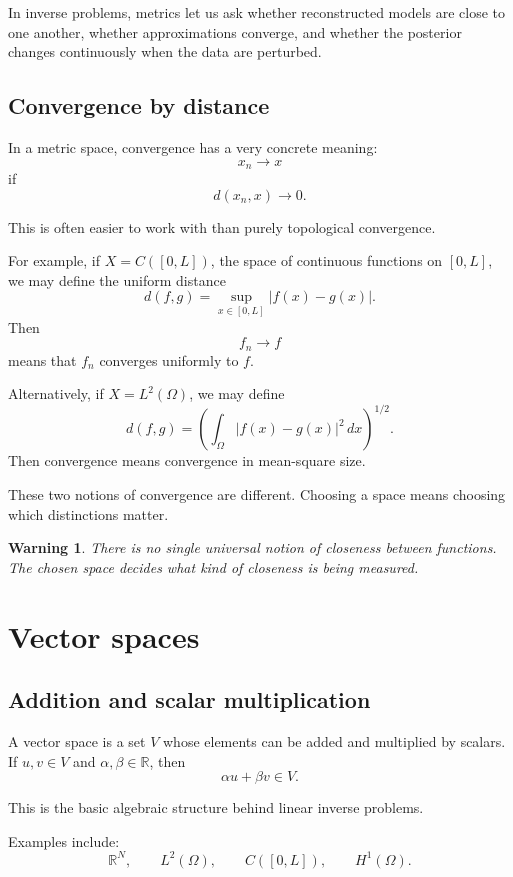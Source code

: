 \documentclass[11pt,a4paper]{book}
\newtheorem{warning}[definition]{Warning}
\newcommand{\R}{\mathbb{R}}
\begin{document}
In inverse problems, metrics let us ask whether reconstructed models are close
to one another, whether approximations converge, and whether the posterior
changes continuously when the data are perturbed.

\subsection{Convergence by distance}

In a metric space, convergence has a very concrete meaning:
\[
    x_n \to x
\]
if
\[
    d(x_n,x)\to 0.
\]

This is often easier to work with than purely topological convergence.

For example, if $X=C([0,L])$, the space of continuous functions on $[0,L]$, we
may define the uniform distance
\[
    d(f,g)
    =
    \sup_{x\in[0,L]} |f(x)-g(x)|.
\]
Then
\[
    f_n \to f
\]
means that $f_n$ converges uniformly to $f$.

Alternatively, if $X=L^2(\Omega)$, we may define
\[
    d(f,g)
    =
    \left(
        \int_\Omega |f(x)-g(x)|^2\,dx
    \right)^{1/2}.
\]
Then convergence means convergence in mean-square size.

These two notions of convergence are different. Choosing a space means choosing
which distinctions matter.

\begin{warning}
There is no single universal notion of closeness between functions. The chosen
space decides what kind of closeness is being measured.
\end{warning}

\section{Vector spaces}

\subsection{Addition and scalar multiplication}

A vector space is a set $V$ whose elements can be added and multiplied by
scalars. If $u,v\in V$ and $\alpha,\beta\in\R$, then
\[
    \alpha u+\beta v \in V.
\]

This is the basic algebraic structure behind linear inverse problems.

Examples include:
\[
    \R^N,
    \qquad
    L^2(\Omega),
    \qquad
    C([0,L]),
    \qquad
    H^1(\Omega).
\]
\end{document}

